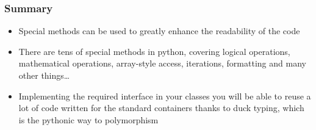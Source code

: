 \documentclass[9pt]{beamer}
\begin{document}
\begin{frame}
  \frametitle{Summary}
  \begin{itemize}
    \item Special methods can be used to greatly enhance the readability of the code
    \bigskip
    \item There are tens of special methods in python, covering logical operations,
          mathematical operations, array-style access, iterations, formatting and
          many other things\dots
    \bigskip
    \item Implementing the required interface in your classes you will be able
          to reuse a lot of code written for the standard containers thanks to
          duck typing, which is the pythonic way to polymorphism
   \end{itemize}  
\end{frame}
\end{document}

